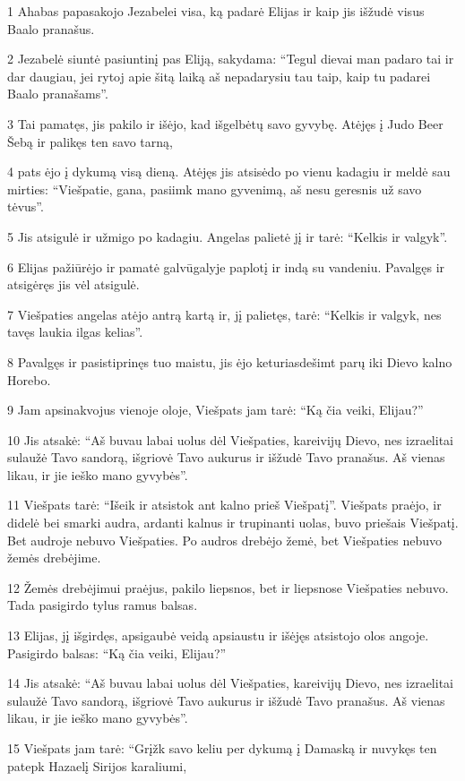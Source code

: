 \par 1 Ahabas papasakojo Jezabelei visa, ką padarė Elijas ir kaip jis išžudė visus Baalo pranašus. 
\par 2 Jezabelė siuntė pasiuntinį pas Eliją, sakydama: “Tegul dievai man padaro tai ir dar daugiau, jei rytoj apie šitą laiką aš nepadarysiu tau taip, kaip tu padarei Baalo pranašams”. 
\par 3 Tai pamatęs, jis pakilo ir išėjo, kad išgelbėtų savo gyvybę. Atėjęs į Judo Beer Šebą ir palikęs ten savo tarną, 
\par 4 pats ėjo į dykumą visą dieną. Atėjęs jis atsisėdo po vienu kadagiu ir meldė sau mirties: “Viešpatie, gana, pasiimk mano gyvenimą, aš nesu geresnis už savo tėvus”. 
\par 5 Jis atsigulė ir užmigo po kadagiu. Angelas palietė jį ir tarė: “Kelkis ir valgyk”. 
\par 6 Elijas pažiūrėjo ir pamatė galvūgalyje paplotį ir indą su vandeniu. Pavalgęs ir atsigėręs jis vėl atsigulė. 
\par 7 Viešpaties angelas atėjo antrą kartą ir, jį palietęs, tarė: “Kelkis ir valgyk, nes tavęs laukia ilgas kelias”. 
\par 8 Pavalgęs ir pasistiprinęs tuo maistu, jis ėjo keturiasdešimt parų iki Dievo kalno Horebo. 
\par 9 Jam apsinakvojus vienoje oloje, Viešpats jam tarė: “Ką čia veiki, Elijau?” 
\par 10 Jis atsakė: “Aš buvau labai uolus dėl Viešpaties, kareivijų Dievo, nes izraelitai sulaužė Tavo sandorą, išgriovė Tavo aukurus ir išžudė Tavo pranašus. Aš vienas likau, ir jie ieško mano gyvybės”. 
\par 11 Viešpats tarė: “Išeik ir atsistok ant kalno prieš Viešpatį”. Viešpats praėjo, ir didelė bei smarki audra, ardanti kalnus ir trupinanti uolas, buvo priešais Viešpatį. Bet audroje nebuvo Viešpaties. Po audros drebėjo žemė, bet Viešpaties nebuvo žemės drebėjime. 
\par 12 Žemės drebėjimui praėjus, pakilo liepsnos, bet ir liepsnose Viešpaties nebuvo. Tada pasigirdo tylus ramus balsas. 
\par 13 Elijas, jį išgirdęs, apsigaubė veidą apsiaustu ir išėjęs atsistojo olos angoje. Pasigirdo balsas: “Ką čia veiki, Elijau?” 
\par 14 Jis atsakė: “Aš buvau labai uolus dėl Viešpaties, kareivijų Dievo, nes izraelitai sulaužė Tavo sandorą, išgriovė Tavo aukurus ir išžudė Tavo pranašus. Aš vienas likau, ir jie ieško mano gyvybės”. 
\par 15 Viešpats jam tarė: “Grįžk savo keliu per dykumą į Damaską ir nuvykęs ten patepk Hazaelį Sirijos karaliumi, 
